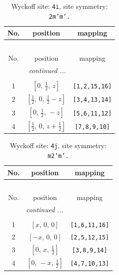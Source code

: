 \documentclass[fleqn,8pt]{jsarticle}
\begin{document}
\renewcommand{\arraystretch}{1.2}
\begin{longtable}{ccc}
\caption{Wyckoff site: {\tt 4i}, site symmetry: {\tt 2m'm'.}}
 \\
 \hline \hline
No. & position & mapping \\ \hline \endfirsthead

\multicolumn{2}{l}{\tablename\ \thetable{}} \\
 \hline \hline
No. & position & mapping \\ \hline \endhead

 \hline \hline
\multicolumn{2}{r}{\footnotesize\it continued ...} \\ \endfoot

 \hline \hline
\multicolumn{2}{r}{} \\ \endlastfoot

1 & $\left[ 0,\, \frac{1}{2},\, z \right]$ & {\tt [1,2,15,16]} \\ \hline
2 & $\left[ \frac{1}{2},\, 0,\, \frac{1}{2} - z \right]$ & {\tt [3,4,13,14]} \\ \hline
3 & $\left[ 0,\, \frac{1}{2},\, - z \right]$ & {\tt [5,6,11,12]} \\ \hline
4 & $\left[ \frac{1}{2},\, 0,\, z + \frac{1}{2} \right]$ & {\tt [7,8,9,10]} \\
\end{longtable}
\renewcommand{\arraystretch}{1.2}
\begin{longtable}{ccc}
\caption{Wyckoff site: {\tt 4j}, site symmetry: {\tt m2'm'.}}
 \\
 \hline \hline
No. & position & mapping \\ \hline \endfirsthead

\multicolumn{2}{l}{\tablename\ \thetable{}} \\
 \hline \hline
No. & position & mapping \\ \hline \endhead

 \hline \hline
\multicolumn{2}{r}{\footnotesize\it continued ...} \\ \endfoot

 \hline \hline
\multicolumn{2}{r}{} \\ \endlastfoot

1 & $\left[ x,\, 0,\, 0 \right]$ & {\tt [1,6,11,16]} \\ \hline
2 & $\left[ - x,\, 0,\, 0 \right]$ & {\tt [2,5,12,15]} \\ \hline
3 & $\left[ 0,\, x,\, \frac{1}{2} \right]$ & {\tt [3,8,9,14]} \\ \hline
4 & $\left[ 0,\, - x,\, \frac{1}{2} \right]$ & {\tt [4,7,10,13]} \\
\end{longtable}
\end{document}
